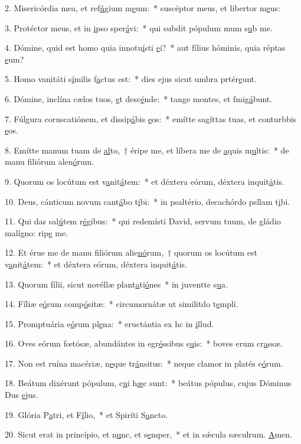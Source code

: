 2. Misericórdia mea, et ref\uline{ú}gium m\uline{e}um:~* suscéptor meus, et libertor m\uline{e}us:\par 
3. Protéctor meus, et in \uline{i}pso sper\uline{á}vi:~* qui subdit pópulum mum s\uline{u}b me.\par 
4. Dómine, quid est homo quia innotu\uline{í}sti \uline{e}i?~* aut fílius hóminis, quia réptas \uline{e}um?\par 
5. Homo vanitáti s\uline{í}milis f\uline{a}ctus est:~* dies ejus sicut umbra prtér\uline{e}unt.\par 
6. Dómine, inclína cælos tuos, \uline{e}t desc\uline{é}nde:~* tange montes, et fmig\uline{á}bunt.\par 
7. Fúlgura coruscatiónem, et dissip\uline{á}bis \uline{e}os:~* emítte sagíttas tuas, et conturbbis \uline{e}os.\par 
8. Emítte manum tuam de \uline{al}to,~† éripe me, et líbera me de \uline{a}quis m\uline{u}ltis:~* de manu filiórum alen\uline{ó}rum.\par 
9. Quorum os locútum est v\uline{a}nit\uline{á}tem:~* et déxtera eórum, déxtera inquit\uline{á}tis.\par 
10. Deus, cánticum novum cant\uline{á}bo t\uline{i}bi:~* in psaltério, decachórdo psllam t\uline{i}bi.\par 
11. Qui das sal\uline{ú}tem r\uline{é}gibus:~* qui redemísti David, servum tuum, de gládio malígno: rip\uline{e} me.\par 
12. Et érue me de manu filiórum alie\uline{nó}rum,~† quorum os locútum est v\uline{a}nit\uline{á}tem:~* et déxtera eórum, déxtera inquit\uline{á}tis.\par 
13. Quorum fílii, sicut novéllæ plant\uline{a}ti\uline{ó}nes~* in juventte s\uline{u}a.\par 
14. Fíliæ e\uline{ó}rum comp\uline{ó}sitæ:~* circumornátæ ut similitdo t\uline{e}mpli.\par 
15. Promptuária e\uline{ó}rum pl\uline{e}na:~* eructántia ex hc in \uline{i}llud.\par 
16. Oves eórum fœtósæ, abundántes in egr\uline{é}ssibus s\uline{u}is:~* boves erum cr\uline{a}ssæ.\par 
17. Non est ruína macériæ, n\uline{e}que tr\uline{á}nsitus:~* neque clamor in platés e\uline{ó}rum.\par 
18. Beátum dixérunt pópulum, c\uline{u}i h\uline{æ}c sunt:~* beátus pópulus, cujus Dóminus Dus \uline{e}jus.\par 
19. Glória P\uline{a}tri, et F\uline{í}lio,~* et Spiríti S\uline{a}ncto.\par 
20. Sicut erat in princípio, et n\uline{u}nc, et s\uline{e}mper,~* et in sǽcula sæculrum. \uline{A}men.\par 
